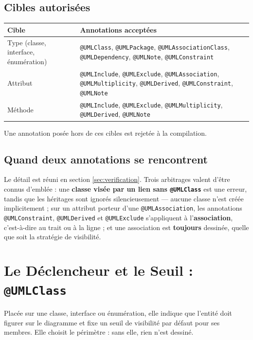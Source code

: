 \documentclass[12pt, a4paper]{article}
\begin{document}
\subsection{Cibles autorisées}
\begin{center}
\begin{tabular}{@{}L{3.8cm}L{12.8cm}@{}}
\hline
\textbf{Cible} & \textbf{Annotations acceptées} \\
\hline
Type \newline \small(classe, interface, énumération) &
\texttt{@UMLClass}, \texttt{@UMLPackage}, \texttt{@UMLAssociationClass}, \texttt{@UMLDependency}, \texttt{@UMLNote}, \texttt{@UMLConstraint} \\[0.4em]
Attribut &
\texttt{@UMLInclude}, \texttt{@UMLExclude}, \texttt{@UMLAssociation}, \texttt{@UMLMultiplicity}, \texttt{@UMLDerived}, \texttt{@UMLConstraint}, \texttt{@UMLNote} \\[0.4em]
Méthode &
\texttt{@UMLInclude}, \texttt{@UMLExclude}, \texttt{@UMLMultiplicity}, \texttt{@UMLDerived}, \texttt{@UMLNote} \\
\hline
\end{tabular}
\end{center}
Une annotation posée hors de ces cibles est rejetée à la compilation.

\subsection{Quand deux annotations se rencontrent}
Le détail est réuni en section \ref{sec:verification}. Trois arbitrages valent d'être connus d'emblée : une \textbf{classe visée par un lien sans \texttt{@UMLClass}} est une erreur, tandis que les héritages sont ignorés silencieusement --- aucune classe n'est créée implicitement ; sur un attribut porteur d'une \texttt{@UMLAssociation}, les annotations \texttt{@UMLConstraint}, \texttt{@UMLDerived} et \texttt{@UMLExclude} s'appliquent à l'\textbf{association}, c'est-à-dire au trait ou à la ligne ; et une association est \textbf{toujours} dessinée, quelle que soit la stratégie de visibilité.

\section{Le Déclencheur et le Seuil : \texttt{@UMLClass}}

Placée sur une classe, interface ou énumération, elle indique que l'entité doit figurer sur le diagramme et fixe un seuil de visibilité par défaut pour ses membres. Elle choisit le périmètre : sans elle, rien n'est dessiné.
\end{document}
